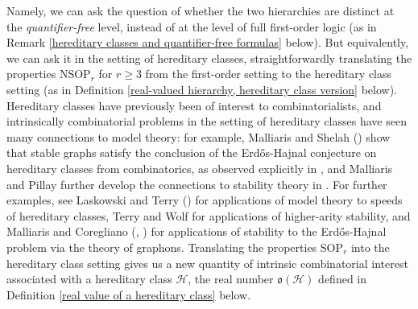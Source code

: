 \documentclass{amsart}
\theoremstyle{definition}
\theoremstyle{remark}
\numberwithin{equation}{section}
\begin{document}
Namely, we can ask the question of whether the two hierarchies are distinct at the \textit{quantifier-free} level, instead of at the level of full first-order logic (as in Remark \ref{hereditary classes and quantifier-free formulas} below). But equivalently, we can ask it in the setting of hereditary classes, straightforwardly translating the properties $\mathrm{NSOP}_{r}$ for $r \geq 3$ from the first-order setting to the hereditary class setting (as in Definition \ref{real-valued hierarchy, hereditary class version} below). Hereditary classes have previously been of interest to combinatorialists, and intrinsically combinatorial problems in the setting of hereditary classes have seen many connections to model theory: for example, Malliaris and Shelah (\cite{MS14}) show that stable graphs satisfy the conclusion of the Erdős-Hajnal conjecture on hereditary classes from combinatorics, as observed explicitly in \cite{CS16}, and Malliaris and Pillay further develop the connections to stability theory in \cite{MP15}. For further examples, see Laskowski and Terry (\cite{LC22}) for applications of model theory to speeds of hereditary classes, Terry and Wolf \cite{TW25} for applications of higher-arity stability, and Malliaris and Coregliano (\cite{CM22}, \cite{CM24}) for applications of stability to the Erdős-Hajnal problem via the theory of graphons. Translating the properties $\mathrm{SOP}_{r}$ into the hereditary class setting gives us a new quantity of intrinsic combinatorial interest associated with a hereditary class $\mathcal{H}$, the real number $\mathfrak{o}(\mathcal{H})$ defined in Definition \ref{real value of a hereditary class} below.
\end{document}
